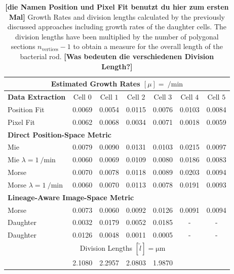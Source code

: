 \documentclass[10pt,letterpaper]{article}
\begin{document}
\begin{table}[H]
    \centering
    \begin{tabular}{l c c c c c c}
        \multicolumn{7}{c}{Estimated Growth Rates $[\mu]=\SI{}{\per\minute}$}\\
        \toprule
        \textbf{Data Extraction} & Cell $0$ & Cell $1$ & Cell $2$ & Cell $3$ & Cell $4$ & Cell $5$\\
        \midrule
        Position Fit & 0.0069 & 0.0054 & 0.0115 & 0.0076 & 0.0103 & 0.0084\\
        Pixel Fit    & 0.0062 & 0.0068 & 0.0034 & 0.0071 & 0.0018 & 0.0059\\

        \multicolumn{7}{l}{\textbf{Direct Position-Space Metric}}\\
        \midrule
        Mie                                 & 0.0079 & 0.0090 & 0.0131 & 0.0103 & 0.0215 & 0.0097\\
        Mie $\lambda=\SI{1}{\per\minute}$   & 0.0060 & 0.0069 & 0.0109 & 0.0080 & 0.0186 & 0.0083\\
        Morse                               & 0.0070 & 0.0078 & 0.0118 & 0.0089 & 0.0203 & 0.0094\\
        Morse $\lambda=\SI{1}{\per\minute}$ & 0.0060 & 0.0070 & 0.0113 & 0.0078 & 0.0191 & 0.0093\\

        \multicolumn{7}{l}{\textbf{Lineage-Aware Image-Space Metric}}\\
        \midrule
        Morse                               & 0.0073 & 0.0060 & 0.0092 & 0.0126 & 0.0091 & 0.0094\\
        Daughter                            & 0.0032 & 0.0179 & 0.0052 & 0.0185 & - & -\\
        Daughter                            & 0.0126 & 0.0048 & 0.0011 & 0.0005 & - & -\\
        \midrule
        & \multicolumn{4}{c}{Division Lengths $[\tilde{l}]=\unit{\micro\metre}$}\\
                                            & 2.1080 & 2.2957 & 2.0803 & 1.9870\\
        \bottomrule
    \end{tabular}
    \caption{{\bf [die Namen Position und Pixel Fit benutzt du hier zum ersten Mal]}
        Growth Rates and division lengths calculated by the previously discussed approaches
        including growth rates of the daughter cells.
        The division lengths have been multiplied by the number of polygonal sections
        $n_\text{vertices}-1$ to obtain a measure for the overall length of the bacterial rod.
        {\bf [Was bedeuten die verschiedenen Division Length?]}
    }
    \label{tab:comparison-growth-rates}
\end{table}
\end{document}

